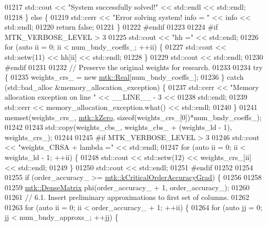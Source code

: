 \begin{DoxyCode}
{{01217     std::cout << \textcolor{stringliteral}{"System successfully solved!"} << std::endl << std::endl;
01218   \} \textcolor{keywordflow}{else} \{
01219     std::cerr << \textcolor{stringliteral}{"Error solving system! info = "} << info << std::endl;
01220     \textcolor{keywordflow}{return} \textcolor{keyword}{false};
01221   \}
01222 \textcolor{preprocessor}{  #endif}
01223 
01224 \textcolor{preprocessor}{  #if MTK\_VERBOSE\_LEVEL > 3}
01225   std::cout << \textcolor{stringliteral}{"hh ="} << std::endl;
01226   \textcolor{keywordflow}{for} (\textcolor{keyword}{auto} ii = 0; ii < num\_bndy\_coeffs\_; ++ii) \{
01227     std::cout << std::setw(11) << hh[ii] << std::endl;
01228   \}
01229   std::cout << std::endl;
01230 \textcolor{preprocessor}{  #endif}
01231 
01232   \textcolor{comment}{// Preserve the original weights for research.}
01233 
01234   \textcolor{keywordflow}{try} \{
01235     weights\_crs\_ = \textcolor{keyword}{new} \hyperlink{group__c01-roots_gac080bbbf5cbb5502c9f00405f894857d}{mtk::Real}[num\_bndy\_coeffs\_];
01236   \} \textcolor{keywordflow}{catch} (std::bad\_alloc &memory\_allocation\_exception) \{
01237     std::cerr << \textcolor{stringliteral}{"Memory allocation exception on line "} << \_\_LINE\_\_ - 3 <<
01238       std::endl;
01239     std::cerr << memory\_allocation\_exception.what() << std::endl;
01240   \}
01241   memset(weights\_crs\_, \hyperlink{group__c01-roots_ga59a451a5fae30d59649bcda274fea271}{mtk::kZero}, \textcolor{keyword}{sizeof}(weights\_crs\_[0])*num\_bndy\_coeffs\_);
01242 
01243   std::copy(weights\_cbs\_, weights\_cbs\_ + (weights\_ld - 1), weights\_crs\_);
01244 
01245 \textcolor{preprocessor}{  #if MTK\_VERBOSE\_LEVEL > 3}
01246   std::cout << \textcolor{stringliteral}{"weights\_CRSA + lambda ="} << std::endl;
01247   \textcolor{keywordflow}{for} (\textcolor{keyword}{auto} ii = 0; ii < weights\_ld - 1; ++ii) \{
01248     std::cout << std::setw(12) << weights\_crs\_[ii] << std::endl;
01249   \}
01250   std::cout << std::endl;
01251 \textcolor{preprocessor}{  #endif}
01252 
01254 
01255   \textcolor{keywordflow}{if} (order\_accuracy\_ >= \hyperlink{group__c01-roots_ga295dd2f403c775ecd942c22b5a777496}{mtk::kCriticalOrderAccuracyGrad}) \{
01256 
01258 
01259     \hyperlink{classmtk_1_1DenseMatrix}{mtk::DenseMatrix} phi(order\_accuracy\_ + 1, order\_accuracy\_);
01260 
01261     \textcolor{comment}{// 6.1. Insert preliminary approximations to first set of columns.}
01262 
01263     \textcolor{keywordflow}{for} (\textcolor{keyword}{auto} ii = 0; ii < order\_accuracy\_ + 1; ++ii) \{
01264       \textcolor{keywordflow}{for} (\textcolor{keyword}{auto} jj = 0; jj < num\_bndy\_approxs\_; ++jj) \{
}}
\end{DoxyCode}
